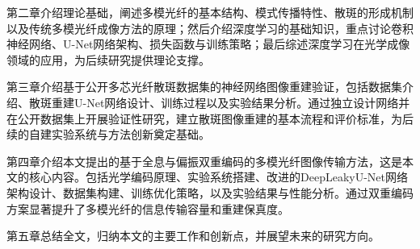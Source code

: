 {第二章介绍理论基础，阐述多模光纤的基本结构、模式传播特性、散斑的形成机制以及传统多模光纤成像方法的原理；然后介绍深度学习的基础知识，重点讨论卷积神经网络、U-Net网络架构、损失函数与训练策略；最后综述深度学习在光学成像领域的应用，为后续研究提供理论支撑。

第三章介绍基于公开多芯光纤散斑数据集的神经网络图像重建验证，包括数据集介绍、散斑重建U-Net网络设计、训练过程以及实验结果分析。通过独立设计网络并在公开数据集上开展验证性研究，建立散斑图像重建的基本流程和评价标准，为后续的自建实验系统与方法创新奠定基础。

第四章介绍本文提出的基于全息与偏振双重编码的多模光纤图像传输方法，这是本文的核心内容。包括光学编码原理、实验系统搭建、改进的DeepLeakyU-Net网络架构设计、数据集构建、训练优化策略，以及实验结果与性能分析。通过双重编码方案显著提升了多模光纤的信息传输容量和重建保真度。

第五章总结全文，归纳本文的主要工作和创新点，并展望未来的研究方向。

}
